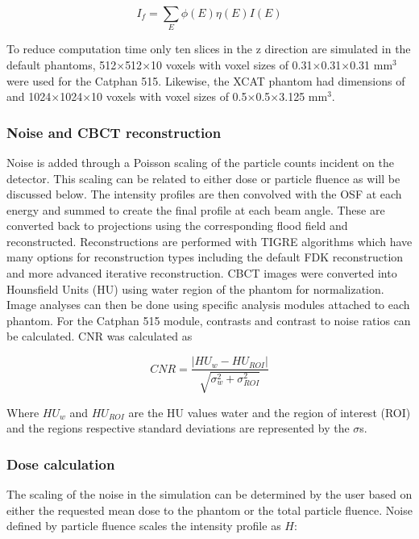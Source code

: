 \begin{equation}
    I_f = \sum\limits_{E} \phi(E) \eta(E) I(E)
\end{equation}

 To reduce computation time only ten slices in the z direction are simulated in the default phantoms, 512$\times$512$\times$10 voxels with voxel sizes of 0.31$\times$0.31$\times$0.31 mm$^3$ were used for the Catphan 515. Likewise, the XCAT phantom had dimensions of and 1024$\times$1024$\times$10 voxels with voxel sizes of 0.5$\times$0.5$\times$3.125 mm$^3$.

\subsubsection{Noise and CBCT reconstruction}

Noise is added through a Poisson scaling of the particle counts incident on the detector. This scaling can be related to either dose or particle fluence as will be discussed below. The intensity profiles are then convolved with the OSF at each energy and summed to create the final profile at each beam angle. These are converted back to projections using the corresponding flood field and reconstructed. Reconstructions are performed with TIGRE algorithms which have many options for reconstruction types including the default FDK reconstruction \cite{Feldkamp1984PracticalAlgorithm} and more advanced iterative reconstruction. CBCT images were converted into Hounsfield Units (HU) using water region of the phantom for normalization. Image analyses can then be done using specific analysis modules attached to each phantom. For the Catphan 515 module, contrasts and contrast to noise ratios can be calculated. CNR was calculated as 

\begin{equation}
    CNR = \frac{|HU_w - HU_{ROI}|}{\sqrt{\sigma_w^2 + \sigma_{ROI}^2}}
\end{equation}

\noindent Where $HU_w$ and $HU_{ROI}$ are the HU values water and the region of interest (ROI) and the regions respective standard deviations are represented by the $\sigma$s.

\subsubsection{Dose calculation}

The scaling of the noise in the simulation can be determined by the user based on either the requested mean dose to the phantom or the total particle fluence. Noise defined by particle fluence scales the intensity profile as $H$:

